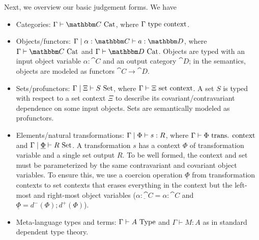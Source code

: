 \documentclass{llncs}
\begin{document}
Next, we overview our basic judgement forms.  We have
\begin{itemize}
\item Categories: ${\Gamma\vdash \cat C \isaCat}$, where ${\Gamma \,\,\textrm{type context}}$.
  
\item Objects/functors: ${\Gamma \pipe \alpha : \cat C \vdash a : \cat
  D}$, where $\Gamma \vdash \cat C\isaCat$ and $\Gamma \vdash \cat D
  \isaCat$.  Objects are typed with an input object variable $\alpha :
  \cat C$ and an output category $\cat D$; in the semantics, objects are
  modeled as functors $\cat C \to \cat D$.
  
\item Sets/profunctors: ${\Gamma \mathrel{|} \Xi \vdash S \,\,\textrm{Set}}$, where
  $\Gamma \vdash \Xi \,\,\textrm{set context}$. A set $S$ is typed with respect to a set
  context $\Xi$ to describe its covariant/contravariant dependence on
  some input objects. Sets are semantically modeled as profunctors.
  
\item Elements/natural transformations: ${\Gamma \mathrel{|} \Phi \vdash s :
  R}$, where ${\Gamma \vdash \Phi \,\,\textrm{trans. context}}$ and $\Gamma\mathrel{|}
  \underline \Phi \vdash R \,\,\textrm{Set}$.  A transformation $s$ has a context
  $\Phi$ of transformation variable and a single set output $R$. To be
  well formed, the context and set must be parameterized by the same
  contravariant and covariant object variables. To ensure this, we use a
  coercion operation $\underline \Phi$ from transformation contexts to
  set contexts that erases everything in the context but the left-most
  and right-most object variables ($\underline{\alpha : \cat C} = \alpha
  : \cat C$ and $\underline{\Phi} = d^-(\Phi);d^+(\Phi)$).

\item Meta-language types and terms: $\Gamma \vdash A \,\,\textrm{Type}$ and
  $\Gamma \vdash M : A$ as in standard dependent type theory.
\end{itemize}



\end{document}
